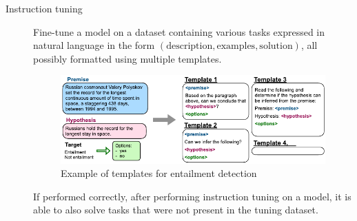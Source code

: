 \begin{description}
    \item[Instruction tuning] 
        Fine-tune a model on a dataset containing various tasks expressed in natural language in the form $(\text{description}, \text{examples}, \text{solution})$, all possibly formatted using multiple templates.

        \begin{figure}[H]
            \centering
            \includegraphics[width=0.7\linewidth]{./img/_instruction_tuning.pdf}
            \caption{Example of templates for entailment detection}
        \end{figure}

        \begin{remark}
            If performed correctly, after performing instruction tuning on a model, it is able to also solve tasks that were not present in the tuning dataset.
        \end{remark}


\end{description}
